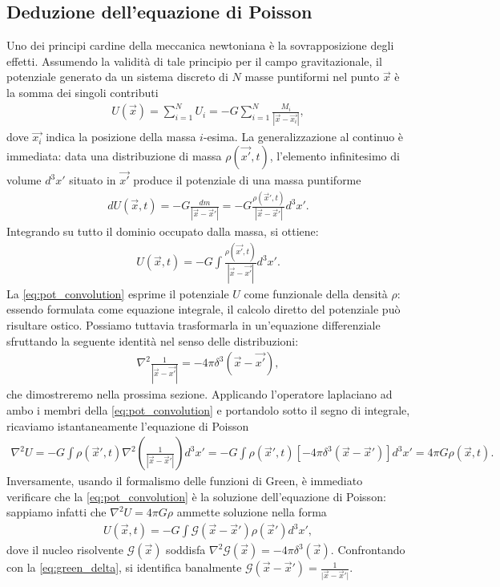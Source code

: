 \subsection{Deduzione dell'equazione di Poisson}
Uno dei principi cardine della meccanica newtoniana è la sovrapposizione degli effetti. Assumendo la validità di tale principio per il campo gravitazionale, il potenziale generato da un sistema discreto di $N$ masse puntiformi nel punto $\vec{x}$ è la somma dei singoli contributi
\begin{align}
    U(\vec{x}) = \sum_{i=1}^N U_i = -G \sum_{i=1}^N \frac{M_i}{|\vec{x} - \vec{x_i}|},
\end{align}
dove $\vec{x_i}$ indica la posizione della massa $i$-esima. La generalizzazione al continuo è immediata: data una distribuzione di massa $\rho(\vec{x'}, t)$, l'elemento infinitesimo di volume $d^3x'$ situato in $\vec{x'}$ produce il potenziale di una massa puntiforme
\begin{align}
    dU(\vec{x}, t) = -G \frac{dm}{|\vec{x}-\vec{x}'|} = -G \frac{\rho(\vec{x}', t)}{|\vec{x}-\vec{x}'|} d^3 x'.
\end{align}
Integrando su tutto il dominio occupato dalla massa, si ottiene:
\begin{align} \label{eq:pot_convolution}
    U(\vec{x}, t) = -G \int \frac{\rho(\vec{x'}, t)}{|\vec{x}-\vec{x'}|} d^3 x'.
\end{align}
La \eqref{eq:pot_convolution} esprime il potenziale $U$ come funzionale della densità $\rho$: essendo formulata come equazione integrale, il calcolo diretto del potenziale può risultare ostico. Possiamo tuttavia trasformarla in un'equazione differenziale sfruttando la seguente identità nel senso delle distribuzioni:
\begin{align}
    \nabla^2 \frac{1}{|\vec{x}-\vec{x'}|} = -4 \pi \delta^3(\vec{x} - \vec{x'}) \label{eq:green_delta},
\end{align}
che dimostreremo nella prossima sezione. Applicando l'operatore laplaciano ad ambo i membri della \eqref{eq:pot_convolution} e portandolo sotto il segno di integrale, ricaviamo istantaneamente l'equazione di Poisson
\begin{align}
    \nabla^2 U = -G \int \rho(\vec{x}', t) \nabla^2 \left(\frac{1}{|\vec{x}-\vec{x}'|}\right) d^3 x' = -G \int \rho(\vec{x}', t) \left[-4 \pi \delta^3 (\vec{x}-\vec{x}')\right] d^3 x' = 4 \pi G \rho(\vec{x}, t).
\end{align}
Inversamente, usando il formalismo delle funzioni di Green, è immediato verificare che la \eqref{eq:pot_convolution} è la soluzione dell'equazione di Poisson: sappiamo infatti che $\nabla^2 U = 4 \pi G \rho$ ammette soluzione nella forma
\begin{align}
    U(\vec{x}, t) = -G \int \mathcal{G}(\vec{x}-\vec{x}') \rho(\vec{x}') d^3 x',
\end{align}
dove il nucleo risolvente $\mathcal{G}(\vec{x})$ soddisfa $\nabla^2 \mathcal{G}(\vec{x}) = - 4 \pi \delta^3(\vec{x})$. Confrontando con la \eqref{eq:green_delta}, si identifica banalmente $\mathcal{G}(\vec{x}-\vec{x}') = \frac{1}{\vert{}\vec{x}-\vec{x}'\vert{}}$.
